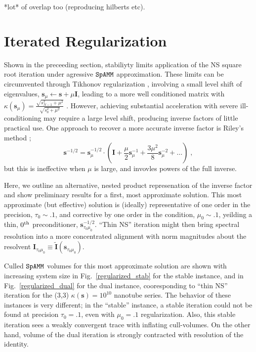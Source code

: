 \documentclass[letterpaper,twocolumn,amsmath,amsfont,amssymb,english,aps,jcp,preprintnumbers,groupaddress,nofootinbib,tightenlines,floatfix]{revtex4}
\newcommand{\mat}[1]{\boldsymbol{#1}}
\theoremstyle{plain}
\theoremstyle{remark}
\theoremstyle{plain}
\begin{document}
 *lot* of overlap too (reproducing hilberts etc).

\section{Iterated Regularization}\label{regularization}

Shown in the preceeding section, stabiliyty limits application of the NS square root iteration under 
agressive $\tt SpAMM$ approximation.  These limits can be circumvented through Tikhonov regularization \cite{}, 
involving a small level shift of eigenvalues,  $\mat{s}_\mu \leftarrow \mat{s}+\mu \mat{I}$, leading to a more 
well conditioned matrix with $\kappa( \mat{s}_\mu) = \frac{\sqrt{s^2_{N-1} + \mu^2}}{\sqrt{s^2_0+\mu^2}}$ \cite{}.  
However, achieving substantial acceleration with severe ill-conditioning  may require a large level shift, 
producing inverse factors of little practical use.  One approach to recover a more accurate inverse
factor is Riley's method \cite{}; 
\begin{equation}
\mat{s}^{-1/2} = \mat{s}^{-1/2}_{\mu} \cdot \left( \mat{I}+\frac{\mu}{2} \mat{s}^{-1}_{\mu}
                                                   +\frac{3 \mu^2}{8} \mat{s}^{-2}_{\mu} + \dots
   \right) \; ,
\end{equation}
but this is ineffective when $\mu$ is large, and invovles powers of the full inverse. 

Here, we outline an alternative,  nested product represenation of the inverse factor and show preliminary 
results for a first, most approximate solution.  This most approximate (but effective) solution is (ideally) representative 
of one order in the precision, $\tau_0\sim .1$, and corrective by one order in the condition, $\mu_0\sim .1$,
yeilding a thin, $0^{\rm th}$ preconditioner, $\mat{s}^{-1/2}_{\tau_0 \mu_0}$.  ``Thin NS'' iteration might then bring 
spectral resolution into a more concentrated alignment with norm magnitudes about the resolvent 
$\mat{I}_{\tau_0\mu_0}\equiv \widetilde{\mat{I}}\left(\mat{s}_{\tau_0\mu_0}\right)$.  

Culled $\tt SpAMM$ volumes for this most approximate solution are shown with increasing system size in 
Fig.~\ref{regularized_stab} for the stable instance, and in Fig.~\ref{regularized_dual} for the dual instance, 
cooresponding to ``thin NS'' iteration for the (3,3) $\kappa(\mat{s})=10^{10}$ nanotube series.  
The behavior of these instances is very different; in the ``stable'' 
instance, a stable iteration could not be found at precision $\tau_0=.1$, even with $\mu_0=.1$ regularization.  Also, this stable iteration
sees a weakly convergent trace with inflating cull-volumes. On the other hand, volume of the dual iteration 
is strongly contracted with resolution of the identity.  
 
\end{document}
